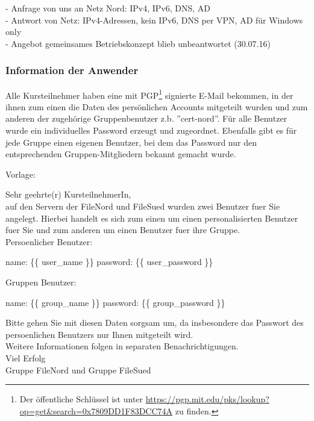 - Anfrage von uns an Netz Nord: IPv4, IPv6, DNS, AD \\
- Antwort von Netz: IPv4-Adressen, kein IPv6, DNS per VPN, AD für Windows only \\
- Angebot gemeinsames Betriebskonzept blieb unbeantwortet (30.07.16) \\

\subsubsection{Information der Anwender}
Alle Kursteilnehmer haben eine mit PGP\footnote{Der öffentliche Schlüssel ist unter \url{https://pgp.mit.edu/pks/lookup?op=get&search=0x7809DD1F83DCC74A} zu finden.} signierte E-Mail bekommen, in der ihnen zum einen die Daten des persönlichen Accounts mitgeteilt wurden und zum anderen der zugehörige Gruppenbenutzer z.b. ''cert-nord''. Für alle Benutzer wurde ein individuelles Password erzeugt und zugeordnet. Ebenfalls gibt es für jede Gruppe einen eigenen Benutzer, bei dem das Password nur den entsprechenden Gruppen-Mitgliedern bekannt gemacht wurde.

Vorlage:
\begin{center}
\begin{framedminipage}{0.8\textwidth}
Sehr geehrte(r) KursteilnehmerIn,\\

auf den Servern der FileNord und FileSued wurden zwei Benutzer fuer Sie
angelegt. Hierbei handelt es sich zum einen um einen personalisierten Benutzer
fuer Sie und zum anderen um einen Benutzer fuer ihre Gruppe.\\

Persoenlicher Benutzer:\bigskip

  name: \{\{ user\_name \}\}
  password: \{\{ user\_password \}\}\bigskip

Gruppen Benutzer:\bigskip

  name: \{\{ group\_name \}\}
  password: \{\{ group\_password \}\}\bigskip

Bitte gehen Sie mit diesen Daten sorgsam um, da insbesondere das Passwort des
persoenlichen Benutzers nur Ihnen mitgeteilt wird.\\

Weitere Informationen folgen in separaten Benachrichtigungen.\\

Viel Erfolg\\

Gruppe FileNord und Gruppe FileSued
\end{framedminipage}
\end{center}

